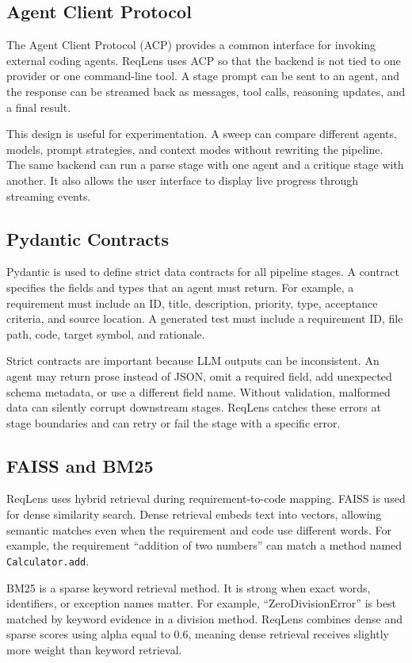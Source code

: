 \documentclass[conference]{IEEEtran}
\begin{document}
\subsection{Agent Client Protocol}
The Agent Client Protocol (ACP) provides a common interface for invoking
external coding agents. ReqLens uses ACP so that the backend is not tied to one
provider or one command-line tool. A stage prompt can be sent to an agent, and
the response can be streamed back as messages, tool calls, reasoning updates,
and a final result.

This design is useful for experimentation. A sweep can compare different
agents, models, prompt strategies, and context modes without rewriting the
pipeline. The same backend can run a parse stage with one agent and a critique
stage with another. It also allows the user interface to display live progress
through streaming events.

\subsection{Pydantic Contracts}
Pydantic is used to define strict data contracts for all pipeline stages. A
contract specifies the fields and types that an agent must return. For example,
a requirement must include an ID, title, description, priority, type,
acceptance criteria, and source location. A generated test must include a
requirement ID, file path, code, target symbol, and rationale.

Strict contracts are important because LLM outputs can be inconsistent. An
agent may return prose instead of JSON, omit a required field, add unexpected
schema metadata, or use a different field name. Without validation, malformed
data can silently corrupt downstream stages. ReqLens catches these errors at
stage boundaries and can retry or fail the stage with a specific error.

\subsection{FAISS and BM25}
ReqLens uses hybrid retrieval during requirement-to-code mapping. FAISS is used
for dense similarity search. Dense retrieval embeds text into vectors, allowing
semantic matches even when the requirement and code use different words. For
example, the requirement ``addition of two numbers'' can match a method named
\texttt{Calculator.add}.

BM25 is a sparse keyword retrieval method. It is strong when exact words,
identifiers, or exception names matter. For example, ``ZeroDivisionError'' is
best matched by keyword evidence in a division method. ReqLens combines dense
and sparse scores using alpha equal to 0.6, meaning dense retrieval receives
slightly more weight than keyword retrieval.
\end{document}
